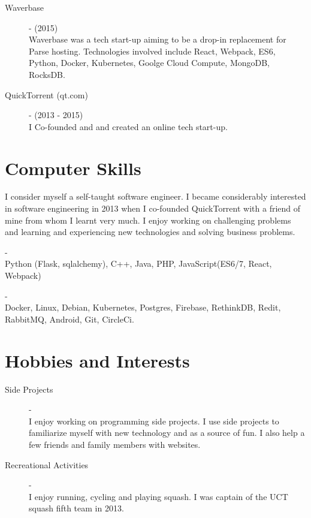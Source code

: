 \documentclass[margin,line,a4paper]{resume}
\begin{document}
\begin{resume}
            \begin{description}
            	\item [Waverbase] - (2015) \\
            	Waverbase was a tech start-up aiming to be a drop-in replacement for Parse hosting.
            	Technologies involved include React, Webpack, ES6, Python, Docker, Kubernetes, Goolge Cloud Compute, MongoDB, RocksDB.
            \end{description}
            
            \begin{description}
            	\item [QuickTorrent (qt.com)] - (2013 - 2015) \\
            	I Co-founded and and created an online tech start-up.
            \end{description}

        \section{\mysidestyle Computer Skills}
            \begin{description}
            	\item
	            	I consider myself a self-taught software engineer. I became considerably interested in software engineering in 2013 when I co-founded QuickTorrent with a friend of mine from whom I learnt very much. I enjoy working on challenging problems and learning and experiencing new technologies and solving business problems.
                \item [Programming, Scripting and Markup Languages] - \\
	                Python (Flask, sqlalchemy), C++, Java, PHP, JavaScript(ES6/7, React, Webpack)
	            \item [Technologies] - \\
	            Docker, Linux, Debian, Kubernetes, Postgres, Firebase, RethinkDB, Redit, RabbitMQ, Android, Git, CircleCi.
            \end{description}
   
	    \section{\mysidestyle Hobbies and Interests}
		    \begin{description}
		    	\item [Side Projects] - \\
			    	I enjoy working on programming side projects. I use side projects to familiarize myself with new technology and as a source of fun.
			    	I also help a few friends and family members with websites.
			    
			    \item [Recreational Activities] - \\
					I enjoy running, cycling and playing squash.
					I was captain of the UCT squash fifth team in 2013.
		    	
		    \end{description}

	       
    \end{resume}
\end{document}
